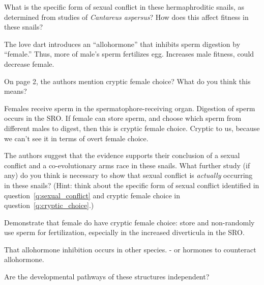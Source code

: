 \documentclass[12pt]{exam}
\begin{document}
\begin{questions}
\question[5]
\label{q:sexual_conflict}What is the specific form of sexual conflict in these hermaphroditic
  snails, as determined from studies of \emph{Cantareus aspersus}? How
  does this affect fitness in these snails?

\ifprintanswers\begin{solution}
The love dart introduces an “allohormone” that inhibits sperm digestion by “female.”  Thus, more of male’s sperm fertilizes egg.  Increases male fitness, could decrease female.
\end{solution}
\else{}
\fi

\question[5]
\label{q:cryptic_choice}On page 2, the authors mention cryptic female choice? What do you
  think this means?

\ifprintanswers\begin{solution}
Females receive sperm in the spermatophore-receiving organ.  Digestion of sperm occurs in the SRO.  If female can store sperm, and choose which sperm from different males to digest, then this is cryptic female choice.  Cryptic to us, because we can’t see it in terms of overt female choice.
\end{solution}
\else
\fi

\question[7]
The authors suggest that the evidence supports their conclusion of a
  sexual conflict and a co-evolutionary arms race in these snails. What
  further study (if any) do you think is necessary to show that sexual
  conflict is \emph{actually} occurring in these snails? (Hint: think about the
  specific form of sexual conflict identified in question~\ref{q:sexual_conflict}  and cryptic female
  choice in question~\ref{q:cryptic_choice}.)

\ifprintanswers\begin{solution}
Demonstrate that female do have cryptic female choice:  store and non-randomly use sperm for fertilization, especially in the increased diverticula in the SRO.

That allohormone inhibition occurs in other species. - or hormones to counteract allohormone.

Are the developmental pathways of these structures independent?
\end{solution}
\else{}
\fi


\end{questions}
\end{document}
